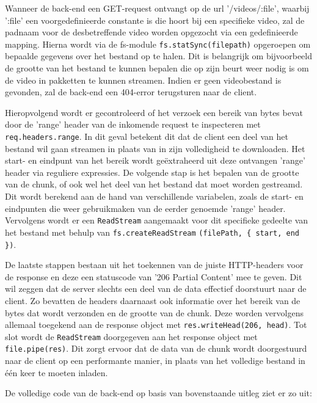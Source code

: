 Wanneer de back-end een GET-request ontvangt op de url '/videos/:file', waarbij ':file' een voorgedefinieerde constante is die hoort bij een specifieke video, zal de padnaam voor de desbetreffende video worden opgezocht via een gedefinieerde mapping. Hierna wordt via de fs-module \verb|fs.statSync(filepath)| opgeroepen om bepaalde gegevens over het bestand op te halen. Dit is belangrijk om bijvoorbeeld de grootte van het bestand te kunnen bepalen die op zijn beurt weer nodig is om de video in pakketten te kunnen streamen. Indien er geen videobestand is gevonden, zal de back-end een 404-error terugsturen naar de client.

Hieropvolgend wordt er gecontroleerd of het verzoek een bereik van bytes bevat door de 'range' header van de inkomende request te inspecteren met \verb|req.headers.range|. In dit geval betekent dit dat de client een deel van het bestand wil gaan streamen in plaats van in zijn volledigheid te downloaden. Het start- en eindpunt van het bereik wordt geëxtraheerd uit deze ontvangen 'range' header via reguliere expressies. De volgende stap is het bepalen van de grootte van de chunk, of ook wel het deel van het bestand dat moet worden gestreamd. Dit wordt berekend aan de hand van verschillende variabelen, zoals de start- en eindpunten die weer gebruikmaken van de eerder genoemde 'range' header. Vervolgens wordt er een \verb|ReadStream|  aangemaakt voor dit specifieke gedeelte van het bestand met behulp van \verb|fs.createReadStream| \verb|(filePath, |\verb|{ start, end })|.

De laatste stappen bestaan uit het toekennen van de juiste HTTP-headers voor de response en deze een statuscode van '206 Partial Content' mee te geven. Dit wil zeggen dat de server slechts een deel van de data effectief doorstuurt naar de client. Zo bevatten de headers daarnaast ook informatie over het bereik van de bytes dat wordt verzonden en de grootte van de chunk. Deze worden vervolgens allemaal toegekend aan de response object met \verb|res.writeHead(206, head)|. Tot slot wordt de \verb|ReadStream| doorgegeven aan het response object met \verb|file.pipe(res)|. Dit zorgt ervoor dat de data van de chunk wordt doorgestuurd naar de client op een performante manier, in plaats van het volledige bestand in één keer te moeten inladen.

De volledige code van de back-end op basis van bovenstaande uitleg ziet er zo uit:

